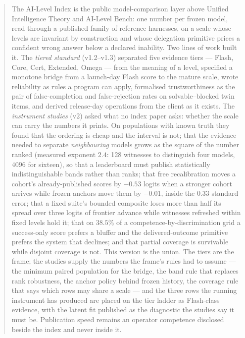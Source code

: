 \documentclass[11pt]{article}
\theoremstyle{definition}
\begin{document}
\begin{abstract}
\noindent The AI-Level Index is the public model-comparison layer above Unified Intelligence Theory and AI-Level Bench: one number per frozen model, read through a published family of reference harnesses, on a scale whose levels are invariant by construction and whose delegation primitive prices a confident wrong answer below a declared inability. Two lines of work built it. The \emph{tiered standard} (v1.2--v1.3) separated five evidence tiers --- Flash, Core, Cert, Extended, Omega --- from the meaning of a level, specified a monotone bridge from a launch-day Flash score to the mature scale, wrote reliability as rules a program can apply, formalised trustworthiness as the pair of false-completion and false-rejection rates on solvable--blocked twin items, and derived release-day operations from the client as it exists. The \emph{instrument studies} (v2) asked what no index paper asks: whether the scale can carry the numbers it prints. On populations with known truth they found that the ordering is cheap and the interval is not; that the evidence needed to separate \emph{neighbouring} models grows as the square of the number ranked (measured exponent $2.4$: 128 witnesses to distinguish four models, 4096 for sixteen), so that a leaderboard must publish statistically indistinguishable bands rather than ranks; that free recalibration moves a cohort's already-published scores by $-0.53$ logits when a stronger cohort arrives while frozen anchors move them by $-0.01$, inside the $0.33$ standard error; that a fixed suite's bounded composite loses more than half its spread over three logits of frontier advance while witnesses refreshed within fixed levels hold it; that on $38.5\%$ of a competence-by-discrimination grid a success-only score prefers a bluffer and the delivered-outcome primitive prefers the system that declines; and that partial coverage is survivable while disjoint coverage is not. This version is the union. The tiers are the frame; the studies supply the numbers the frame's rules had to assume --- the minimum paired population for the bridge, the band rule that replaces rank robustness, the anchor policy behind frozen history, the coverage rule that says which rows may share a scale --- and the three rows the running instrument has produced are placed on the tier ladder as Flash-class evidence, with the latent fit published as the diagnostic the studies say it must be. Publication speed remains an operator competence disclosed beside the index and never inside it.
\end{abstract}
\end{document}
